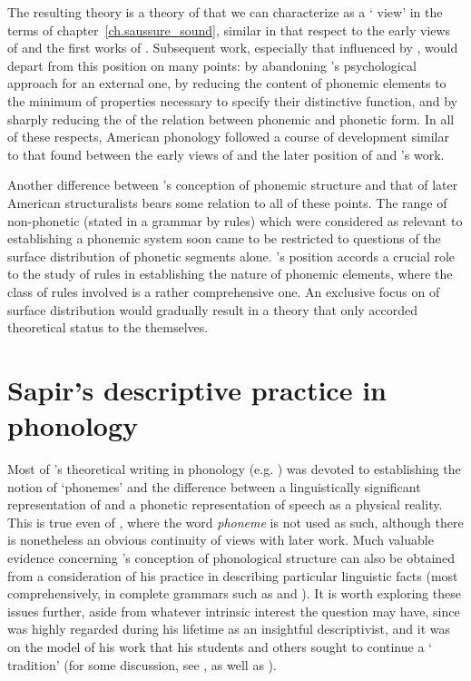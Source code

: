 The resulting theory is a theory of  that we
can characterize as a ` view' in the
terms of chapter~\ref{ch.saussure_sound}, similar in that respect to
the early views of {\DeCourtenay} and the first works of
{\Trubetzkoy}. Subsequent work, especially that influenced by {\Bloomfield},
would depart from this position on many points: by abandoning {\Sapir}'s
psychological approach for an external one, by reducing the content of
phonemic elements to the minimum of properties necessary to specify
their distinctive function, and by sharply reducing the 
of the relation between phonemic and phonetic form. In all of these
respects, American phonology followed a course of development similar
to that found between the early views of {\Baudouin} and the later
position of {\Trubetzkoy} and {\Jakobson}'s work.

Another difference between {\Sapir}'s conception of phonemic structure
and that of later American structuralists bears some relation to all
of these points. The range of non-phonetic  (stated in a
grammar by rules) which were considered as relevant to establishing a
phonemic system soon came to be restricted to questions of the surface
distribution of phonetic segments alone. {\Sapir}'s position accords a
crucial role to the study of rules in establishing the nature of
phonemic elements, where the class of rules involved is a rather
comprehensive one. An exclusive focus on  of surface
distribution would gradually result in a theory that only accorded
theoretical status to the  themselves.

\section{Sapir's descriptive practice in phonology}

Most of {\Sapir}'s theoretical writing in phonology
(e.g. \citealt{sapir21:language,sapir25:sound.patterns,sapir33:reality})
was devoted to establishing the notion of `phonemes' and the
difference between a linguistically significant representation of
 and a phonetic representation of speech as a physical
reality. This is true even of \citealt{sapir21:language}, where the
word \emph{phoneme} is not used as such, although there is nonetheless
an obvious continuity of views with later work. Much valuable evidence
concerning {\Sapir}'s conception of phonological structure can also be
obtained from a consideration of his practice in describing particular
linguistic facts (most comprehensively, in complete grammars such as
\citealt{sapir22:takelma} and \citeyear{sapir30:s.paiute}). It is
worth exploring these issues further, aside from whatever intrinsic
interest the question may have, since {\Sapir} was highly regarded during
his lifetime as an insightful descriptivist, and it was on the model
of his work that his students and others sought to continue a `{\Sapir}
tradition' (for some discussion, see
\citealt{harris44:yokuts,harris45:navajo,harris51:rvw.sapir}, as well
as \citealt{hymes.fought81:structuralism}).

